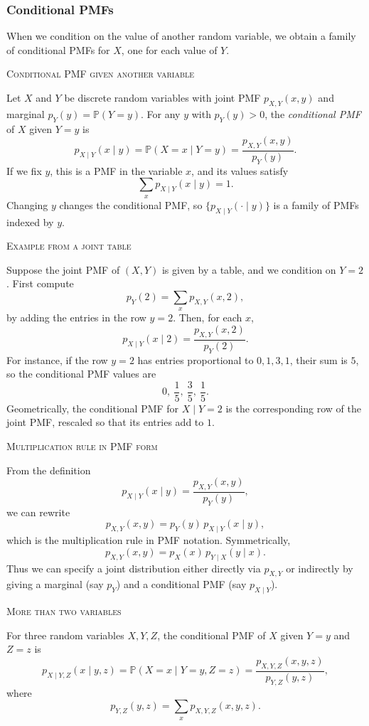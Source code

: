 \newpage
\subsubsection{Conditional PMFs}

When we condition on the value of another random variable, we obtain a family of conditional PMFs for \(X\), one for each value of \(Y\).

\bigskip\textsc{Conditional PMF given another variable}

Let \(X\) and \(Y\) be discrete random variables with joint PMF \(p_{X,Y}(x,y)\) and marginal \(p_Y(y) = \mathbb{P}(Y=y)\).  
For any \(y\) with \(p_Y(y) > 0\), the \textit{conditional PMF} of \(X\) given \(Y=y\) is
\[
p_{X\mid Y}(x\mid y)
= \mathbb{P}(X = x \mid Y = y)
= \frac{p_{X,Y}(x,y)}{p_Y(y)}.
\]
If we fix \(y\), this is a PMF in the variable \(x\), and its values satisfy
\[
\sum_x p_{X\mid Y}(x\mid y) = 1.
\]
Changing \(y\) changes the conditional PMF, so \(\{p_{X\mid Y}(\cdot\mid y)\}\) is a family of PMFs indexed by \(y\).

\bigskip\textsc{Example from a joint table}

Suppose the joint PMF of \((X,Y)\) is given by a table, and we condition on \(Y=2\).  
First compute
\[
p_Y(2) = \sum_x p_{X,Y}(x,2),
\]
by adding the entries in the row \(y=2\).  
Then, for each \(x\),
\[
p_{X\mid Y}(x\mid 2)
= \frac{p_{X,Y}(x,2)}{p_Y(2)}.
\]
For instance, if the row \(y=2\) has entries proportional to \(0,1,3,1\), their sum is \(5\), so the conditional PMF values are
\[
0,\ \frac{1}{5},\ \frac{3}{5},\ \frac{1}{5}.
\]
Geometrically, the conditional PMF for \(X\mid Y=2\) is the corresponding row of the joint PMF, rescaled so that its entries add to \(1\).

\bigskip\textsc{Multiplication rule in PMF form}

From the definition
\[
p_{X\mid Y}(x\mid y) = \frac{p_{X,Y}(x,y)}{p_Y(y)},
\]
we can rewrite
\[
p_{X,Y}(x,y)
= p_Y(y)\,p_{X\mid Y}(x\mid y),
\]
which is the multiplication rule in PMF notation.  
Symmetrically,
\[
p_{X,Y}(x,y)
= p_X(x)\,p_{Y\mid X}(y\mid x).
\]
Thus we can specify a joint distribution either directly via \(p_{X,Y}\) or indirectly by giving a marginal (say \(p_Y\)) and a conditional PMF (say \(p_{X\mid Y}\)).

\bigskip\textsc{More than two variables}

For three random variables \(X,Y,Z\), the conditional PMF of \(X\) given \(Y=y\) and \(Z=z\) is
\[
p_{X\mid Y,Z}(x\mid y,z)
= \mathbb{P}(X=x \mid Y=y, Z=z)
= \frac{p_{X,Y,Z}(x,y,z)}{p_{Y,Z}(y,z)},
\]
where
\[
p_{Y,Z}(y,z) = \sum_x p_{X,Y,Z}(x,y,z).
\]

